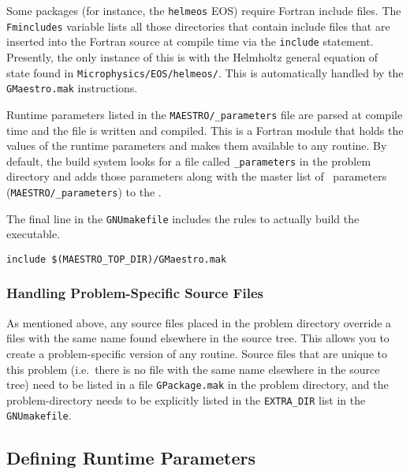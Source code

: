Some packages (for instance, the {\tt helmeos}
EOS) require Fortran include files.  The {\tt Fmincludes} variable
lists all those directories that contain include files that are
inserted into the Fortran source at compile time via the {\tt include}
statement.  Presently, the only instance of this is with the Helmholtz
general equation of state found in {\tt Microphysics/EOS/helmeos/}.  This is
automatically handled by the {\tt GMaestro.mak} instructions.

Runtime parameters listed in the {\tt MAESTRO/\_parameters} file are
parsed at compile time and the file  is written and
compiled.  This is a Fortran module that holds the values of the
runtime parameters and makes them available to any routine.  By
default, the build system looks for a file called {\tt \_parameters}
in the problem directory and adds those parameters along with the
master list of \maestro\ parameters ({\tt MAESTRO/\_parameters}) to
the .

The final line in the {\tt GNUmakefile} includes the rules to actually
build the executable.
\begin{lstlisting}[language={[gnu]make},mathescape=false]
  include $(MAESTRO_TOP_DIR)/GMaestro.mak
\end{lstlisting}


\subsubsection{Handling Problem-Specific Source Files}

As mentioned above, any source files placed in the problem directory
override a files with the same name found elsewhere in the source
tree.  This allows you to create a problem-specific version of any
routine.  Source files that are unique to this problem (i.e.\ there is
no file with the same name elsewhere in the source tree) need to be
listed in a file {\tt GPackage.mak} in the problem directory, and
the problem-directory needs to be explicitly listed in the {\tt EXTRA\_DIR}
list in the {\tt GNUmakefile}.


\subsection{Defining Runtime Parameters}

\label{sec:def_runtime_param}


